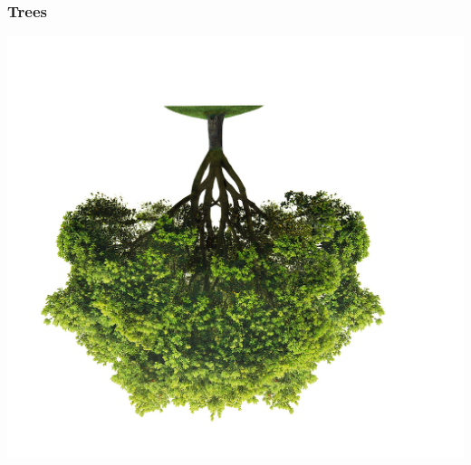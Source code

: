 \documentclass{beamer}
\begin{document}
\begin{frame}[plain]
\frametitle{Trees}
\vspace{-10mm}
\hspace*{8mm}
\includegraphics[scale=.88]{treepicflip}
\end{frame}
\end{document}
